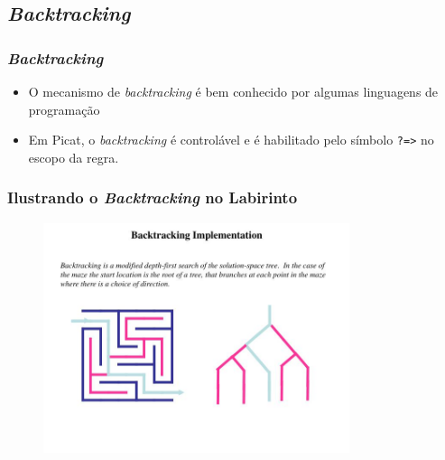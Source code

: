 
\subsection{\textit{Backtracking}}
\begin{frame}[fragile]

\frametitle{\textit{Backtracking}}
\begin{itemize}
  \item O mecanismo de \textit{backtracking} é bem conhecido por algumas linguagens de programação

  
  \pause 
  \item Em Picat, o \textit{backtracking} é controlável e é habilitado pelo símbolo
  \verb!?=>! no escopo da regra. 

\end{itemize}

\end{frame}

\begin{frame}[fragile]
\frametitle{Ilustrando o \textit{Backtracking} no Labirinto}

\begin{figure}[!htb]
\begin{center}
\includegraphics[width=0.80\textwidth, height=0.90\textheight]{figures/ilustra_backtracking_01.jpg}
\end{center}
\end{figure}
\end{frame}

